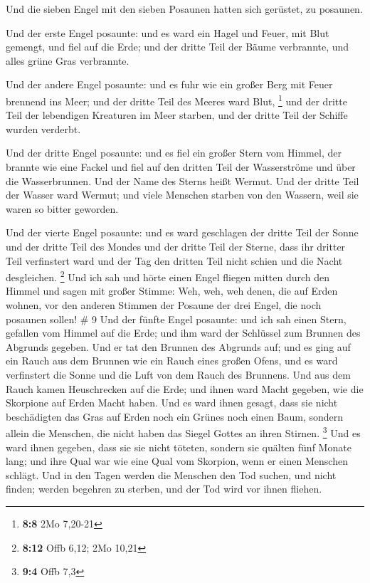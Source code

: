  Und die sieben Engel mit den sieben Posaunen hatten sich
gerüstet, zu posaunen.

 Und der erste Engel posaunte: und es ward ein Hagel und
Feuer, mit Blut gemengt, und fiel auf die Erde; und der dritte Teil der
Bäume verbrannte, und alles grüne Gras verbrannte.

 Und der andere Engel posaunte: und es fuhr wie ein großer
Berg mit Feuer brennend ins Meer; und der dritte Teil des Meeres ward
Blut, \footnote{\textbf{8:8} 2Mo 7,20-21}  und der dritte
Teil der lebendigen Kreaturen im Meer starben, und der dritte Teil der
Schiffe wurden verderbt.

 Und der dritte Engel posaunte: und es fiel ein großer
Stern vom Himmel, der brannte wie eine Fackel und fiel auf den dritten
Teil der Wasserströme und über die Wasserbrunnen.  Und
der Name des Sterns heißt Wermut. Und der dritte Teil der Wasser ward
Wermut; und viele Menschen starben von den Wassern, weil sie waren so
bitter geworden.

 Und der vierte Engel posaunte: und es ward geschlagen
der dritte Teil der Sonne und der dritte Teil des Mondes und der dritte
Teil der Sterne, dass ihr dritter Teil verfinstert ward und der Tag den
dritten Teil nicht schien und die Nacht desgleichen. \footnote{\textbf{8:12}
  Offb 6,12; 2Mo 10,21}  Und ich sah und hörte einen
Engel fliegen mitten durch den Himmel und sagen mit großer Stimme: Weh,
weh, weh denen, die auf Erden wohnen, vor den anderen Stimmen der
Posaune der drei Engel, die noch posaunen sollen! \# 9 
Und der fünfte Engel posaunte: und ich sah einen Stern, gefallen vom
Himmel auf die Erde; und ihm ward der Schlüssel zum Brunnen des Abgrunds
gegeben.  Und er tat den Brunnen des Abgrunds auf; und es
ging auf ein Rauch aus dem Brunnen wie ein Rauch eines großen Ofens, und
es ward verfinstert die Sonne und die Luft von dem Rauch des Brunnens.
 Und aus dem Rauch kamen Heuschrecken auf die Erde; und
ihnen ward Macht gegeben, wie die Skorpione auf Erden Macht haben.
 Und es ward ihnen gesagt, dass sie nicht beschädigten das
Gras auf Erden noch ein Grünes noch einen Baum, sondern allein die
Menschen, die nicht haben das Siegel Gottes an ihren Stirnen.
\footnote{\textbf{9:4} Offb 7,3}  Und es ward ihnen
gegeben, dass sie sie nicht töteten, sondern sie quälten fünf Monate
lang; und ihre Qual war wie eine Qual vom Skorpion, wenn er einen
Menschen schlägt.  Und in den Tagen werden die Menschen
den Tod suchen, und nicht finden; werden begehren zu sterben, und der
Tod wird vor ihnen fliehen.

